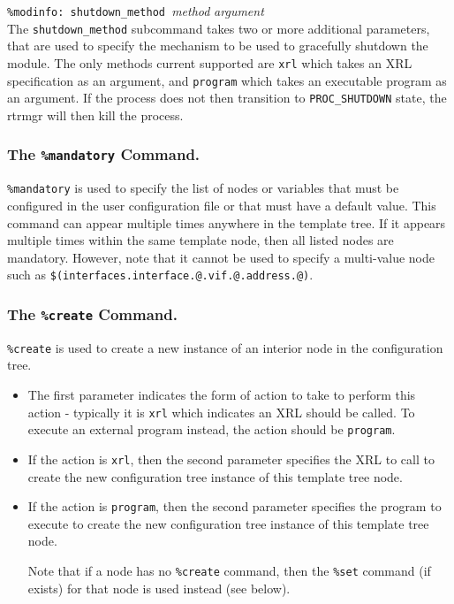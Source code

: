 \documentclass[11pt]{article}
\begin{document}
\begin{description}
\item {{\tt \%modinfo: shutdown\_method }{\it method }{\it argument}}  \\
The {\tt shutdown\_method} subcommand takes two or more additional parameters,
that are used to specify the mechanism to be used to gracefully shutdown the
module. The only methods current supported are {\tt xrl} which takes an XRL
specification as an argument, and {\tt program} which takes an executable
program as an argument.
If the process does not then transition to {\tt PROC\_SHUTDOWN} state, the
rtrmgr will then kill the process.

\end{description}

\subsubsection{The {\tt \%mandatory} Command.}
{\tt \%mandatory} is used to specify the list of nodes or variables
that must be configured in the user configuration file or that must
have a default value. This command can appear multiple times anywhere in the
template tree. If it appears multiple times within the same template node,
then all listed nodes are mandatory. However, note that it cannot be used
to specify a multi-value node such as
{\tt \$(interfaces.interface.@.vif.@.address.@)}.

\subsubsection{The {\tt \%create} Command.}
{\tt \%create} is used to create a new instance of an interior node in
the configuration tree.

\begin{itemize}

  \item The first parameter indicates the form of
   action to take to perform this action - typically it is {\tt xrl}
   which indicates an XRL should be called.
   To execute an external program instead, the action should be {\tt program}.

  \item If the action is {\tt xrl}, then the second parameter specifies the
   XRL to call to create the new configuration tree instance of this template
   tree node.

  \item If the action is {\tt program}, then the second parameter specifies the
   program to execute to create the new configuration tree instance of this
   template tree node. 

Note that if a node has no {\tt \%create} command, then the {\tt \%set}
command (if exists) for that node is used instead (see below).

\end{itemize}
\end{document}
